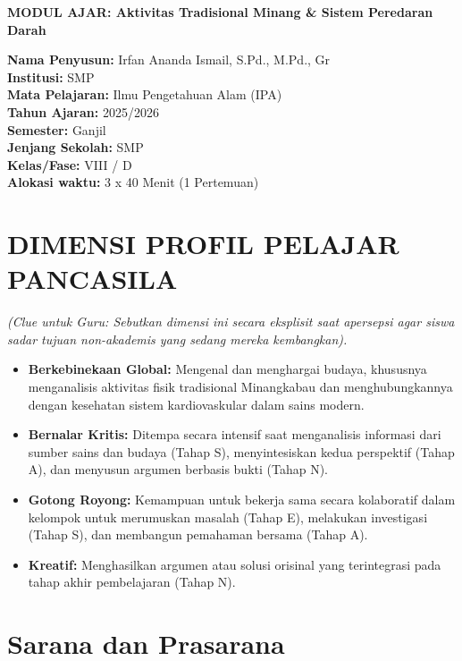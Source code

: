 \documentclass[a4paper,12pt]{article}
\begin{document}
\begin{center}
{\Large\textbf{MODUL AJAR: Aktivitas Tradisional Minang \& Sistem Peredaran Darah}}
\end{center}

\vspace{0.5cm}

\begin{tcolorbox}[mainbox]
\textbf{Nama Penyusun:} Irfan Ananda Ismail, S.Pd., M.Pd., Gr \\
\textbf{Institusi:} SMP \\
\textbf{Mata Pelajaran:} Ilmu Pengetahuan Alam (IPA) \\
\textbf{Tahun Ajaran:} 2025/2026 \\
\textbf{Semester:} Ganjil \\
\textbf{Jenjang Sekolah:} SMP \\
\textbf{Kelas/Fase:} VIII / D \\
\textbf{Alokasi waktu:} 3 x 40 Menit (1 Pertemuan)
\end{tcolorbox}

\section{DIMENSI PROFIL PELAJAR PANCASILA}
\textit{(Clue untuk Guru: Sebutkan dimensi ini secara eksplisit saat apersepsi agar siswa sadar tujuan non-akademis yang sedang mereka kembangkan).}

\begin{itemize}
\item \textbf{Berkebinekaan Global:} Mengenal dan menghargai budaya, khususnya menganalisis aktivitas fisik tradisional Minangkabau dan menghubungkannya dengan kesehatan sistem kardiovaskular dalam sains modern.
\item \textbf{Bernalar Kritis:} Ditempa secara intensif saat menganalisis informasi dari sumber sains dan budaya (Tahap S), menyintesiskan kedua perspektif (Tahap A), dan menyusun argumen berbasis bukti (Tahap N).
\item \textbf{Gotong Royong:} Kemampuan untuk bekerja sama secara kolaboratif dalam kelompok untuk merumuskan masalah (Tahap E), melakukan investigasi (Tahap S), dan membangun pemahaman bersama (Tahap A).
\item \textbf{Kreatif:} Menghasilkan argumen atau solusi orisinal yang terintegrasi pada tahap akhir pembelajaran (Tahap N).
\end{itemize}

\section{Sarana dan Prasarana}
\end{document}
